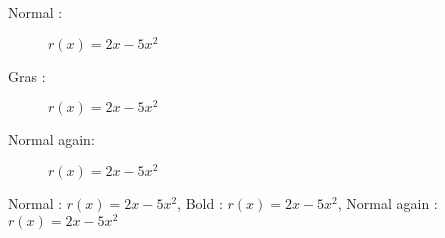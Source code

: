 \documentclass[french]{article}
\newcommand{\formule}{$r(x)=2x-5x^{2}$}
\begin{document}
	\begin{description}
		\item[Normal      :]                      \formule
		\item[Gras        :]    \formule
		\item[Normal again:]  \formule
	\end{description}

\bigskip
\noindent
Normal       : \formule ,
Bold         :    \formule ,
Normal again : \formule
\end{document}
